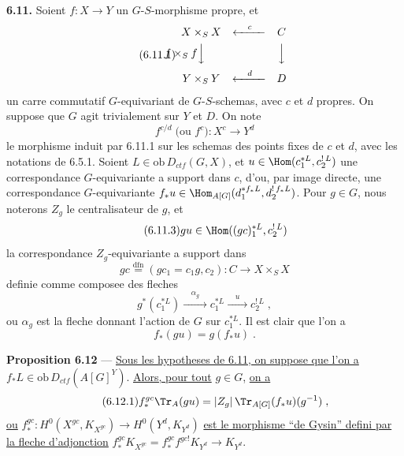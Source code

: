 \medskip
\noindent\textbf{6.11.} Soient $f : X \longrightarrow Y$ un $G$-$S$-morphisme propre, et
\begin{equation}\tag{6.11.1}
\begin{array}{ccc}
X \times_S X & \xleftarrow{\quad c\quad} & C \\[4pt]
\llap{$f \times_S f$}\Big\downarrow\rlap{$\quad$} & & \Big\downarrow \\[8pt]
Y \times_S Y & \xleftarrow{\quad d\quad} & D
\end{array}
\end{equation}
un carre commutatif $G$-equivariant de $G$-$S$-schemas, avec $c$ et $d$ propres. On suppose que $G$ agit trivialement sur $Y$ et $D$. On note
\begin{equation}\tag{6.11.2}
f^{c/d}\;\text{(ou }f^c) : X^c \longrightarrow Y^d
\end{equation}
le morphisme induit par 6.11.1 sur les schemas des points fixes de $c$ et $d$, avec les notations de 6.5.1. Soient $L \in \mathrm{ob}\, D_{ctf}(G,X)$, et $u \in \Hom(c_1^{*L}, c_2^{!\,L})$ une correspondance $G$-equivariante a support dans $c$, d'ou, par image directe, une correspondance $G$-equivariante $f_*u \in \Hom_{A[G]}(d_1^{*f_*L}, d_2^{!\,f_*L})$. Pour $g \in G$, nous noterons $Z_g$ le centralisateur de $g$, et
\begin{equation}\tag{6.11.3}
gu \in \Hom((gc)_1^{*L}, c_2^{!\,L})
\end{equation}
la correspondance $Z_g$-equivariante a support dans
\begin{equation}\tag{6.11.4}
gc \overset{\mathrm{dfn}}{=} (gc_1 = c_1g, c_2) : C \longrightarrow X \times_S X
\end{equation}
definie comme composee des fleches
\[
g^*(c_1^{*L}) \xrightarrow{\quad\alpha_g\quad} c_1^{*L} \xrightarrow{\quad u\quad} c_2^{!\,L}\;,
\]
ou $\alpha_g$ est la fleche donnant l'action de $G$ sur $c_1^{*L}$. Il est clair que l'on a
\begin{equation}\tag{6.11.5}
f_*(gu) = g(f_* u)\;.
\end{equation}

\medskip
\noindent\textbf{Proposition 6.12} --- \underline{Sous les hypotheses de 6.11, on suppose que l'on a} $f_* L \in \mathrm{ob}\, D_{ctf}(A[G]^Y)$. \underline{Alors, pour tout} $g \in G$, \underline{on a}
\begin{equation}\tag{6.12.1}
f_*^{gc}\Tr_A(gu) = |Z_g|\,\Tr_{A[G]}(f_* u)(g^{-1})\;,
\end{equation}
\underline{ou} $f_*^{gc} : H^0(X^{gc}, K_{X^{gc}}) \longrightarrow H^0(Y^d, K_{Y^d})$ \underline{est le morphisme ``de Gysin'' defini par la fleche d'adjonction} $f_*^{gc}K_{X^{gc}} = f_*^{gc}f^{gc!}K_{Y^d} \longrightarrow K_{Y^d}$.

